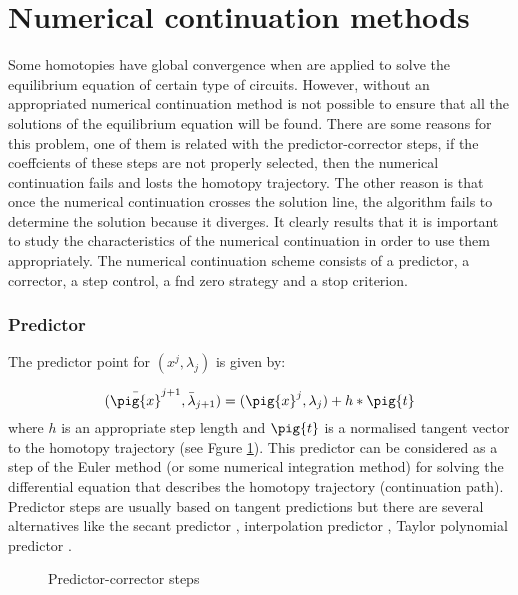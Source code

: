 \documentclass[conference]{IEEEtran}
\begin{document}
\section{Numerical continuation methods}

Some homotopies have global convergence when are applied to solve the equilibrium equation of certain type of circuits. 
However, without an appropriated numerical continuation method is not possible to ensure that all the solutions of
the equilibrium equation will be found.  There are some reasons for
this problem, one of them is related with the
predictor-corrector steps, if the coeffcients of these steps are not properly selected,
then the numerical continuation fails and losts
the homotopy trajectory. The other reason is that once the numerical continuation crosses the solution line,
the algorithm fails to determine the solution because it diverges. It clearly results that it is important to study the characteristics
of the numerical continuation in order to use them appropriately.
The numerical continuation scheme consists of a predictor, a corrector, a step control, a fnd zero strategy and
a stop criterion.

\newpage

\subsubsection{Predictor}

The predictor point for $(x^j,\lambda_j)$ is given by:

\begin{displaymath}
(\bar{\pig{x}}^{j+1},\bar{\lambda}_{j+1})=(\pig{x}^j,\lambda_j)+h*\pig{t}
\end{displaymath}
where $h$ is an appropriate step length and $\pig{t}$ is a normalised tangent vector to the
homotopy trajectory (see Fgure \ref{pcorrector}). This predictor can be considered as a step of the Euler
method  (or some numerical integration method) for solving the differential equation that describes
the homotopy trajectory (continuation path). 
Predictor steps are usually based on tangent predictions but there are
several alternatives like
 the secant predictor \cite{homo_seydel}, interpolation predictor
\cite{homo_allgower}, Taylor polynomial predictor \cite{homo_allgower}. 


\begin{figure}[hbtp]
\centerline{
\epsfxsize=60mm
}
\caption{Predictor-corrector steps}
\label{pcorrector}
\end{figure}
\end{document}
